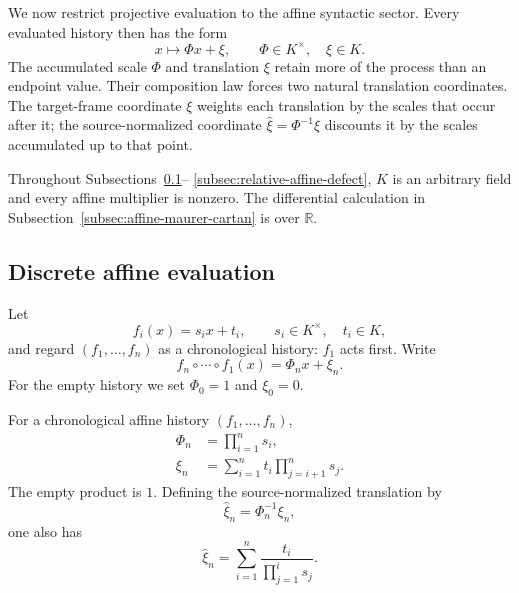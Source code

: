 We now restrict projective evaluation to the affine syntactic sector.  Every
evaluated history then has the form
\[
  x\longmapsto \Phi x+\xi,
  \qquad \Phi\in K^\times,\quad \xi\in K.
\]
The accumulated scale $\Phi$ and translation $\xi$ retain more of the process
than an endpoint value.  Their composition law forces two natural translation
coordinates.  The target-frame coordinate $\xi$ weights each translation by
the scales that occur after it; the source-normalized coordinate
$\widehat\xi=\Phi^{-1}\xi$ discounts it by the scales accumulated up to that
point.

Throughout Subsections~\ref{subsec:discrete-affine-cocycles}--
\ref{subsec:relative-affine-defect}, $K$ is an arbitrary field and every
affine multiplier is nonzero.  The differential calculation in
Subsection~\ref{subsec:affine-maurer-cartan} is over $\mathbb R$.

\subsection{Discrete affine evaluation}
\label{subsec:discrete-affine-cocycles}

Let
\[
  f_i(x)=s_i x+t_i,
  \qquad s_i\in K^\times,\quad t_i\in K,
\]
and regard $(f_1,\ldots,f_n)$ as a chronological history: $f_1$ acts first.
Write
\begin{equation}
  f_n\circ\cdots\circ f_1(x)=\Phi_nx+\xi_n.
  \label{eq:affine-history-normal-form}
\end{equation}
For the empty history we set $\Phi_0=1$ and $\xi_0=0$.

\begin{proposition}
\label{prop:affine-cocycle-formulas}
\label{prop:target-affine-cocycle}
\label{prop:source-normalized-cocycle}
For a chronological affine history $(f_1,\ldots,f_n)$,
\begin{align}
  \Phi_n&=\prod_{i=1}^{n}s_i,
  \label{eq:accumulated-affine-scale}\\
  \xi_n&=\sum_{i=1}^{n}t_i\prod_{j=i+1}^{n}s_j.
  \label{eq:target-affine-cocycle}
\end{align}
The empty product is $1$.  Defining the source-normalized translation by
\begin{equation}
  \widehat\xi_n=\Phi_n^{-1}\xi_n,
  \label{eq:source-normalized-translation-definition}
\end{equation}
one also has
\begin{equation}
  \widehat\xi_n
  =\sum_{i=1}^{n}\frac{t_i}{\prod_{j=1}^{i}s_j}.
  \label{eq:source-normalized-affine-cocycle}
\end{equation}
\end{proposition}

